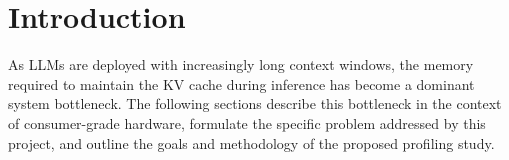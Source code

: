 \documentclass[
english,                 %
bibtex,                  %
]{kththesis}
\newcommand*{\engExpl}[1]{\todo[inline, backgroundcolor=kth-lightgreen40]{#1}} %
\numberwithin{listing}{chapter}
\begin{document}


\renewcommand{\chaptermark}[1]{ \markboth{#1}{}} 
\tableofcontents
  \markboth{\contentsname}{}



\printglossary[style=mylong, type=\acronymtype, title={List of acronyms and abbreviations}]


\ifnomenclature
    \cleardoublepage
    \printnomenclature
\fi

\label{pg:lastPageofPreface}
\mainmatter
\glsresetall
\renewcommand{\chaptermark}[1]{\markboth{#1}{}}
\chapter{Introduction}
\label{ch:introduction}

As \glspl{LLM} are deployed with increasingly long context windows, the memory required to maintain the \gls{KV} cache during inference has become a dominant system bottleneck. The following sections describe this bottleneck in the context of consumer-grade hardware, formulate the specific problem addressed by this project, and outline the goals and methodology of the proposed profiling study.
\end{document}
